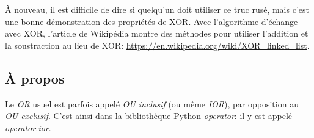 À nouveau, il est difficile de dire si quelqu'un doit utiliser ce truc rusé, mais
c'est une bonne démonstration des propriétés de XOR. Avec l'algorithme d'échange
avec XOR, l'article de Wikipédia montre des méthodes pour utiliser l'addition et
la soustraction au lieu de XOR:
\url{https://en.wikipedia.org/wiki/XOR_linked_list}.



\subsection{À propos}

Le \emph{OR} usuel est parfois appelé \emph{OU inclusif} (ou même \emph{IOR}), par opposition
au \emph{OU exclusif}.
C'est ainsi dans la bibliothèque Python \emph{operator}: il y est appelé \emph{operator.ior}.

